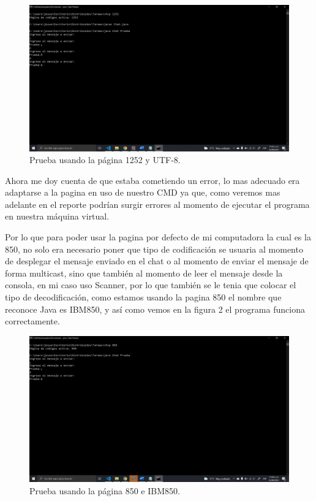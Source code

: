\documentclass[11pt]{article}
\begin{document}
		\begin{figure}[H]
			\centering
			\includegraphics[scale=0.43]{resources/prueba1252utf8.png}
			\caption{Prueba usando la página 1252 y UTF-8.}\label{fig:picture}
		\end{figure}		
Ahora me doy cuenta de que estaba cometiendo un error, lo mas adecuado era adaptarse a la pagina en uso de nuestro CMD ya que, como veremos mas adelante en el reporte podrían surgir errores al momento de ejecutar el programa en nuestra máquina virtual.\par
Por lo que para poder usar la pagina por defecto de mi computadora la cual es la 850, no solo era necesario poner que tipo de codificación se usuaria al momento de desplegar el mensaje enviado en el chat o al momento de enviar el mensaje de forma multicast, sino que también al momento de leer el mensaje desde la consola, en mi caso uso Scanner, por lo que también se le tenia que colocar el tipo de decodificación, como estamos usando la pagina 850 el nombre que reconoce Java es IBM850, y así como vemos en la figura 2 el programa funciona correctamente.\par 
		\begin{figure}[H]
			\centering
			\includegraphics[scale=0.43]{resources/prueba850ibm.png}
			\caption{Prueba usando la página 850 e IBM850.}\label{fig:picture}
		\end{figure}
\end{document}
